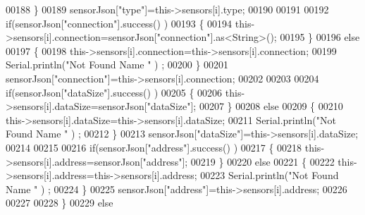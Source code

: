 \begin{DoxyCode}
00188                         \}
00189                         sensorJson[\textcolor{stringliteral}{"type"}]=this->sensors[i].type;
00190                     
00191                     
00192                         \textcolor{keywordflow}{if}(sensorJson[\textcolor{stringliteral}{"connection"}].success() )
00193                         \{
00194                             this->sensors[i].connection=sensorJson[\textcolor{stringliteral}{"connection"}].as<String>();
00195                         \}
00196                         \textcolor{keywordflow}{else}
00197                         \{
00198                             this->sensors[i].connection=this->sensors[i].connection;
00199                             Serial.println(\textcolor{stringliteral}{"Not Found Name "} ) ;                        
00200                         \}
00201                         sensorJson[\textcolor{stringliteral}{"connection"}]=this->sensors[i].connection;
00202 
00203                     
00204                         \textcolor{keywordflow}{if}(sensorJson[\textcolor{stringliteral}{"dataSize"}].success() )
00205                         \{               
00206                             this->sensors[i].dataSize=sensorJson[\textcolor{stringliteral}{"dataSize"}];
00207                         \}
00208                         \textcolor{keywordflow}{else}
00209                         \{
00210                             this->sensors[i].dataSize=this->sensors[i].dataSize;
00211                             Serial.println(\textcolor{stringliteral}{"Not Found Name "} ) ;                        
00212                         \}
00213                         sensorJson[\textcolor{stringliteral}{"dataSize"}]=this->sensors[i].dataSize;
00214 
00215                     
00216                         \textcolor{keywordflow}{if}(sensorJson[\textcolor{stringliteral}{"address"}].success() )
00217                         \{                   
00218                             this->sensors[i].address=sensorJson[\textcolor{stringliteral}{"address"}];
00219                         \}
00220                         \textcolor{keywordflow}{else}
00221                         \{   
00222                             this->sensors[i].address=this->sensors[i].address;
00223                             Serial.println(\textcolor{stringliteral}{"Not Found Name "} ) ;                        
00224                         \}
00225                         sensorJson[\textcolor{stringliteral}{"address"}]=this->sensors[i].address;
00226                     
00227     
00228                     \}
00229                     \textcolor{keywordflow}{else}

\end{DoxyCode}
